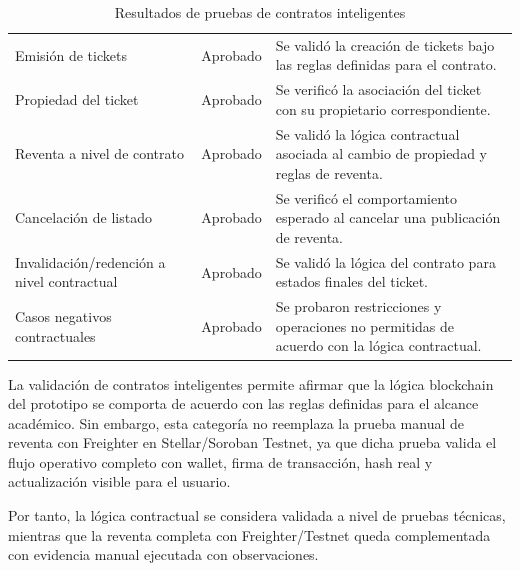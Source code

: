 \documentclass[12pt,letterpaper]{article}
\begin{document}
\begin{table}[H]
\centering
\begingroup
\scriptsize
\setlength{\tabcolsep}{3pt}
\renewcommand{\arraystretch}{1.18}

\begin{tabularx}{\textwidth}{|
>{\raggedright\arraybackslash}p{3.8cm}|
>{\centering\arraybackslash}p{2.4cm}|
>{\raggedright\arraybackslash}X|}
\hline
\multicolumn{1}{|>{\centering\arraybackslash}m{3.8cm}|}{\textbf{Elemento evaluado}} &
\multicolumn{1}{>{\centering\arraybackslash}m{2.4cm}|}{\textbf{Resultado}} &
\multicolumn{1}{>{\centering\arraybackslash}m{8.1cm}|}{\textbf{Observación}} \\
\hline
Emisión de tickets & Aprobado & Se validó la creación de tickets bajo las reglas definidas para el contrato. \\
\hline
Propiedad del ticket & Aprobado & Se verificó la asociación del ticket con su propietario correspondiente. \\
\hline
Reventa a nivel de contrato & Aprobado & Se validó la lógica contractual asociada al cambio de propiedad y reglas de reventa. \\
\hline
Cancelación de listado & Aprobado & Se verificó el comportamiento esperado al cancelar una publicación de reventa. \\
\hline
Invalidación/redención a nivel contractual & Aprobado & Se validó la lógica del contrato para estados finales del ticket. \\
\hline
Casos negativos contractuales & Aprobado & Se probaron restricciones y operaciones no permitidas de acuerdo con la lógica contractual. \\
\hline
\end{tabularx}

\endgroup
\caption{Resultados de pruebas de contratos inteligentes}
\label{tab:contratos-resultados}
\end{table}

La validación de contratos inteligentes permite afirmar que la lógica blockchain del prototipo se comporta de acuerdo con las reglas definidas para el alcance académico. Sin embargo, esta categoría no reemplaza la prueba manual de reventa con Freighter en Stellar/Soroban Testnet, ya que dicha prueba valida el flujo operativo completo con wallet, firma de transacción, hash real y actualización visible para el usuario.

Por tanto, la lógica contractual se considera validada a nivel de pruebas técnicas, mientras que la reventa completa con Freighter/Testnet queda complementada con evidencia manual ejecutada con observaciones.
\end{document}
